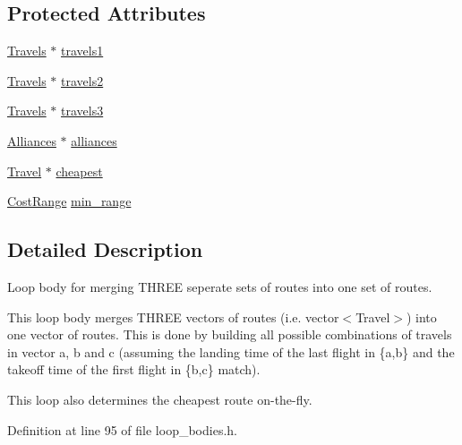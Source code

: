 \subsection*{Protected Attributes}
\begin{DoxyCompactItemize}
\item 
\hyperlink{types_8h_aef021ba284c03a12dddcfa082468e831}{Travels} $\ast$ \hyperlink{classoma_1_1_path_merging_triple_outer_loop_a0720980b36610f250de8344bd24e0df1}{travels1}
\item 
\hyperlink{types_8h_aef021ba284c03a12dddcfa082468e831}{Travels} $\ast$ \hyperlink{classoma_1_1_path_merging_triple_outer_loop_a5df3c60b5e2bae045e6e91bf5bbaa26f}{travels2}
\item 
\hyperlink{types_8h_aef021ba284c03a12dddcfa082468e831}{Travels} $\ast$ \hyperlink{classoma_1_1_path_merging_triple_outer_loop_a0c7c5e666337c432267d668172bc2e1b}{travels3}
\item 
\hyperlink{types_8h_a942cbcc40778424afe78605ae5c364c0}{Alliances} $\ast$ \hyperlink{classoma_1_1_path_merging_triple_outer_loop_a4e3f9fd341284f12e5df2d63ada79f36}{alliances}
\item 
\hyperlink{class_travel}{Travel} $\ast$ \hyperlink{classoma_1_1_path_merging_triple_outer_loop_a963284c20dbc179aac8be227de3b736b}{cheapest}
\item 
\hyperlink{class_cost_range}{Cost\-Range} \hyperlink{classoma_1_1_path_merging_triple_outer_loop_aebc3758ded80d3a61500b8a80c963061}{min\-\_\-range}
\end{DoxyCompactItemize}


\subsection{Detailed Description}
Loop body for merging T\-H\-R\-E\-E seperate sets of routes into one set of routes. 

This loop body merges T\-H\-R\-E\-E vectors of routes (i.\-e. vector$<$\-Travel$>$) into one vector of routes. This is done by building all possible combinations of travels in vector a, b and c (assuming the landing time of the last flight in \{a,b\} and the takeoff time of the first flight in \{b,c\} match).

This loop also determines the cheapest route on-\/the-\/fly. 

Definition at line 95 of file loop\-\_\-bodies.\-h.



